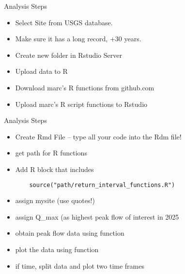 \documentclass{beamer}
\begin{document}
\begin{frame}{Analysis Steps}
    \begin{itemize}
        \item Select Site from USGS database.
        \item Make sure it has a long record, +30 years.
        \item Create new folder in Rstudio Server
        \item Upload data to R
        \item Download marc's R functions from github.com
        \item Upload marc's R script functions to Rstudio
    \end{itemize}
\end{frame}


\begin{frame}[fragile]{Analysis Steps}
    \begin{itemize}
        \item Create Rmd File -- type all your code into the Rdm file!
        \item get path for R functions
        \item Add R block that includes
    \begin{verbatim}
    source("path/return_interval_functions.R")
    \end{verbatim}
        \item assign mysite (use quotes!)
        \item assign Q\_max (as highest peak flow of interest in 2025
        \item obtain peak flow data using function
        \item plot the data using function
        \item if time, split data and plot two time frames
    \end{itemize}
\end{frame}
\end{document}
